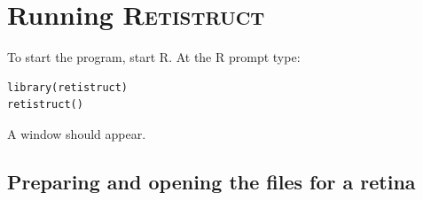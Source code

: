 \documentclass{book}
\begin{document}



\chapter{Running \textsc{Retistruct}}
\label{manual:sec:running}

To start the program, start \textsc{R}. At the \textsc{R} prompt type:

\begin{verbatim}
library(retistruct)
retistruct()
\end{verbatim}
A window should appear.

\section{Preparing and opening the files for a retina}
\label{manual:sec:opening-files-retina}
\end{document}
